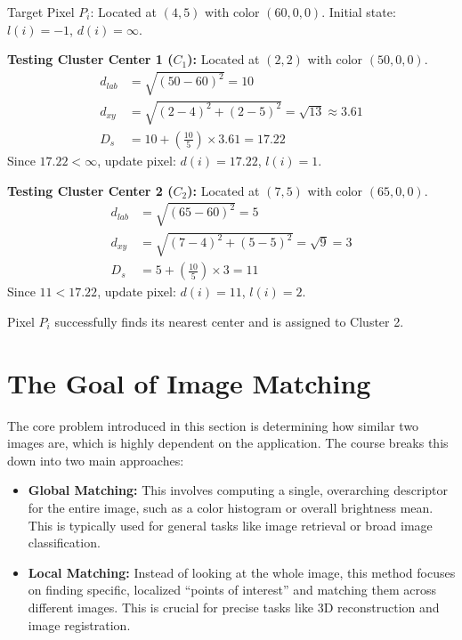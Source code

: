 \documentclass{report}
\begin{document}
Target Pixel $P_i$: Located at $(4, 5)$ with color $(60, 0, 0)$. Initial state: $l(i) = -1$, $d(i) = \infty$.

\textbf{Testing Cluster Center 1 ($C_1$):}
Located at $(2, 2)$ with color $(50, 0, 0)$.
\begin{align*}
    d_{lab} & = \sqrt{(50 - 60)^2} = 10                               \\
    d_{xy}  & = \sqrt{(2 - 4)^2 + (2 - 5)^2} = \sqrt{13} \approx 3.61 \\
    D_s     & = 10 + \left(\frac{10}{5}\right) \times 3.61 = 17.22
\end{align*}
Since $17.22 < \infty$, update pixel: $d(i) = 17.22$, $l(i) = 1$.

\textbf{Testing Cluster Center 2 ($C_2$):}
Located at $(7, 5)$ with color $(65, 0, 0)$.
\begin{align*}
    d_{lab} & = \sqrt{(65 - 60)^2} = 5                      \\
    d_{xy}  & = \sqrt{(7 - 4)^2 + (5 - 5)^2} = \sqrt{9} = 3 \\
    D_s     & = 5 + \left(\frac{10}{5}\right) \times 3 = 11
\end{align*}
Since $11 < 17.22$, update pixel: $d(i) = 11$, $l(i) = 2$.

Pixel $P_i$ successfully finds its nearest center and is assigned to Cluster 2.


\chapter{The Goal of Image Matching}
The core problem introduced in this section is determining how similar two images are, which is highly dependent on the application.
The course breaks this down into two main approaches:
\begin{itemize}
    \item \textbf{Global Matching:} This involves computing a single, overarching descriptor for the entire image, such as a color histogram or
          overall brightness mean. This is typically used for general tasks like image retrieval or broad image classification.
    \item \textbf{Local Matching:} Instead of looking at the whole image, this method focuses on finding specific, localized
          ``points of interest'' and matching them across different images. This is crucial for precise tasks like 3D reconstruction and image registration.
\end{itemize}
\end{document}
